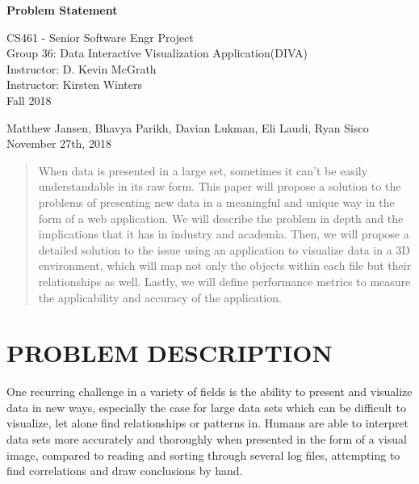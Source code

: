 \documentclass[journal,10pt,onecolumn,compsoc]{IEEEtran} \usepackage[margin=1.0in]{geometry} \usepackage{pdfpages}
\begin{document}
\begin{center}
  

  \vspace{2.5cm}
  \Huge{}
  \textbf{Problem Statement}
  \vspace{1.5cm}

 
  \LARGE
  CS461 - Senior Software Engr Project\\
  \vspace{0.25cm}
  Group 36: Data Interactive Visualization Application(DIVA)\\
  Instructor: D. Kevin McGrath \\
  Instructor: Kirsten Winters \\
  \vspace{0.25cm}
  Fall 2018 \\
  \vspace{1cm}
  
  \large{Matthew Jansen, Bhavya Parikh, Davian Lukman, Eli Laudi, Ryan Sisco}\\
  \vfill
  November 27th, 2018\\
  \vspace{1cm}
  \vspace*{\fill}
   \begin{abstract}
     When data is presented in a large set, sometimes it can't be easily understandable in its raw form. This paper will propose a solution to the problems of presenting new data in a meaningful and unique way in the form of a web application. We will describe the problem in depth and the implications that it has in industry and academia. Then, we will propose a detailed solution to the issue using an application to visualize data in a 3D environment, which will map not only the objects within each file but their relationships as well. Lastly, we will define performance metrics to measure the applicability and accuracy of the application.
       \noindent 
   \end{abstract}
   \normalsize 
  \end{center}
\newpage
\tableofcontents
\newpage

\section{PROBLEM DESCRIPTION}
    One recurring challenge in a variety of fields is the ability to present and visualize data in new ways, especially the case for large data sets which can be difficult to visualize, let alone find relationships or patterns in. Humans are able to interpret data sets more accurately and thoroughly when presented in the form of a visual image, compared to reading and sorting through several log files, attempting to find correlations and draw conclusions by hand.
    
\end{document}
